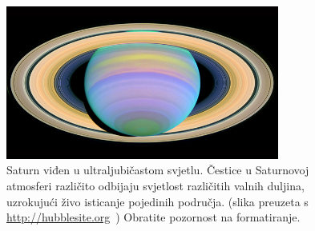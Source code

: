 \documentclass[12pt,a4paper,oneside]{article}
\begin{document}
\begin{linenumbers}
		\begin{figure}[h!]
			\centering
			\includegraphics[width=0.8\textwidth]{slika_Saturn.png}
			\caption[Saturn viđen u ultraljubičastom svjetlu.]{\label{sl:primjer}Saturn viđen u ultraljubičastom svjetlu. Čestice u Saturnovoj atmosferi različito odbijaju svjetlost različitih valnih duljina, uzrokujući živo isticanje pojedinih područja. (slika preuzeta s \protect\url{http://hubblesite.org}~\cite{NASA}) Obratite pozornost na formatiranje.\footnotemark}
		\end{figure}
		

\end{linenumbers}
\end{document}
